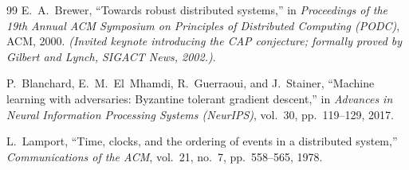 \documentclass[applsci,article,submit,oneauthor,pdftex]{Definitions/mdpi}
\begin{document}
\begin{thebibliography}{99}
E.~A.~Brewer,
``Towards robust distributed systems,''
in \textit{Proceedings of the 19th Annual ACM Symposium on Principles of Distributed Computing (PODC)},
ACM, 2000.
\textit{(Invited keynote introducing the CAP conjecture; formally proved by Gilbert and Lynch, SIGACT News, 2002.)}.

P.~Blanchard, E.~M.~El~Mhamdi, R.~Guerraoui, and J.~Stainer,
``Machine learning with adversaries: Byzantine tolerant gradient descent,''
in \textit{Advances in Neural Information Processing Systems (NeurIPS)},
vol.~30, pp.~119--129, 2017.

L.~Lamport,
``Time, clocks, and the ordering of events in a distributed system,''
\textit{Communications of the ACM},
vol.~21, no.~7, pp.~558--565, 1978.

\end{thebibliography}
\end{document}
